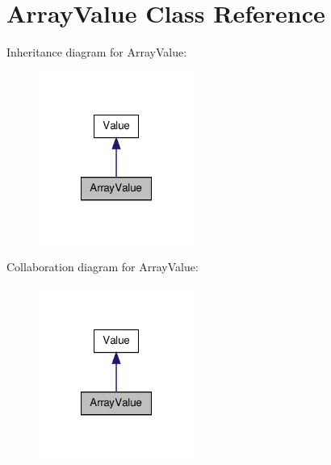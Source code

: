 \hypertarget{class_array_value}{\section{Array\-Value Class Reference}
\label{class_array_value}
}


Inheritance diagram for Array\-Value\-:
\nopagebreak
\begin{figure}[H]
\begin{center}
\leavevmode
\includegraphics[width=144pt]{class_array_value__inherit__graph}
\end{center}
\end{figure}


Collaboration diagram for Array\-Value\-:
\nopagebreak
\begin{figure}[H]
\begin{center}
\leavevmode
\includegraphics[width=144pt]{class_array_value__coll__graph}
\end{center}
\end{figure}
